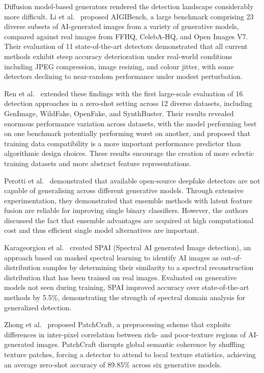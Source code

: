 Diffusion model-based generators rendered the detection landscape considerably more difficult. Li et al.~\cite{li2025aigibench} proposed AIGIBench, a large benchmark comprising 23 diverse subsets of AI-generated images from a variety of generative models, compared against real images from FFHQ, CelebA-HQ, and Open Images V7. Their evaluation of 11 state-of-the-art detectors demonstrated that all current methods exhibit steep accuracy deterioration under real-world conditions including JPEG compression, image resizing, and colour jitter, with some detectors declining to near-random performance under modest perturbation.

Ren et al.~\cite{ren2026benchmark} extended these findings with the first large-scale evaluation of 16 detection approaches in a zero-shot setting across 12 diverse datasets, including GenImage, WildFake, OpenFake, and SynthBuster. Their results revealed enormous performance variation across datasets, with the model performing best on one benchmark potentially performing worst on another, and proposed that training data compatibility is a more important performance predictor than algorithmic design choices. These results encourage the creation of more eclectic training datasets and more abstract feature representations.

Perotti et al.~\cite{perotti2025nodedetector} demonstrated that available open-source deepfake detectors are not capable of generalising across different generative models. Through extensive experimentation, they demonstrated that ensemble methods with latent feature fusion are reliable for improving single binary classifiers. However, the authors discussed the fact that ensemble advantages are acquired at high computational cost and thus efficient single model alternatives are important.

Karageorgiou et al.~\cite{karageorgiou2024spai} created SPAI (Spectral AI generated Image detection), an approach based on masked spectral learning to identify AI images as out-of-distribution samples by determining their similarity to a spectral reconstruction distribution that has been trained on real images. Evaluated on generative models not seen during training, SPAI improved accuracy over state-of-the-art methods by 5.5\%, demonstrating the strength of spectral domain analysis for generalized detection.

Zhong et al.~\cite{zhong2024patchcraft} proposed PatchCraft, a preprocessing scheme that exploits differences in inter-pixel correlation between rich- and poor-texture regions of AI-generated images. PatchCraft disrupts global semantic coherence by shuffling texture patches, forcing a detector to attend to local texture statistics, achieving an average zero-shot accuracy of 89.85\% across six generative models.

